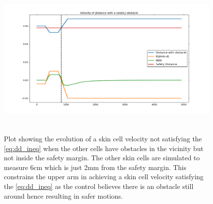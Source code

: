 \begin{figure}[H]
\centering
\includegraphics[width=18cm,height=8cm,center]{chapters/doa/images/delft/plot_unsatisfy.png}
\caption{Plot showing the evolution of a skin cell velocity not satisfying the \ref{eq:dd_ineq} when the other cells have obstacles in the vicinity but not inside the safety margin. The other skin cells are simulated to measure 6cm which is just 2mm from the safety margin. This constrains the upper arm in achieving a skin cell velocity satisfying the \ref{eq:dd_ineq} as the control believes there is an obstacle still around hence resulting in safer motions.}
\label{fig:plot_unsatisfy}
\end{figure}






